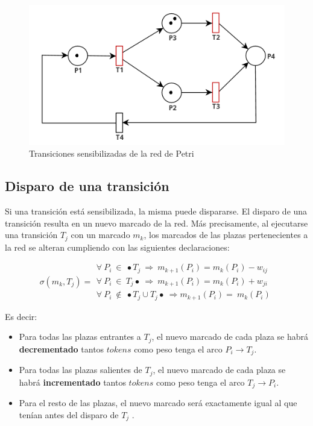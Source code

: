 \begin{figure}[H]
    \centering
    \includegraphics[width=0.6\linewidth]{images/rdp_sensibilizada.png}
    \caption{Transiciones sensibilizadas de la red de Petri}
    \label{fig:rdp_sensibilizada}
\end{figure}

\subsection{Disparo de una transición}
Si una transición está sensibilizada, la misma puede dispararse. El disparo de una transición resulta en un nuevo marcado de la red. Más precisamente, al ejecutarse una transición $T_j$ con un marcado $m_k$, los marcados de las plazas pertenecientes a la red se alteran cumpliendo con las siguientes declaraciones:

\begin{equation}
    \sigma (m_k, T_j) = 
    \begin{array}{cc}
         \forall \ P_i \ \in \ \bullet T_j \ \Rightarrow \ m_{k+1}(P_i) = m_k(P_i) - w_{ij}  \\
         \forall \ P_i \ \in \ T_j \bullet \ \Rightarrow \ m_{k+1}(P_i) = m_k(P_i) + w_{ji}  \\
         \forall \ P_i \ \notin \ \bullet T_j \cup T_j \bullet \ \Rightarrow m_{k+1}(P_i) = \ m_k(P_i)
    \end{array}
\end{equation}

\noindent Es decir:
\begin{itemize}
    \item Para todas las plazas entrantes a $T_j$, el nuevo marcado de cada plaza se habrá \textbf{decrementado} tantos $tokens$ como peso tenga el arco $P_i \rightarrow T_j$. 
    \item Para todas las plazas salientes de $T_j$, el nuevo marcado de cada plaza se habrá \textbf{incrementado} tantos $tokens$ como peso tenga el arco $T_j \rightarrow P_i$.
    \item Para el resto de las plazas, el nuevo marcado será exactamente igual al que tenían antes del disparo de $T_j$ .
\end{itemize}

